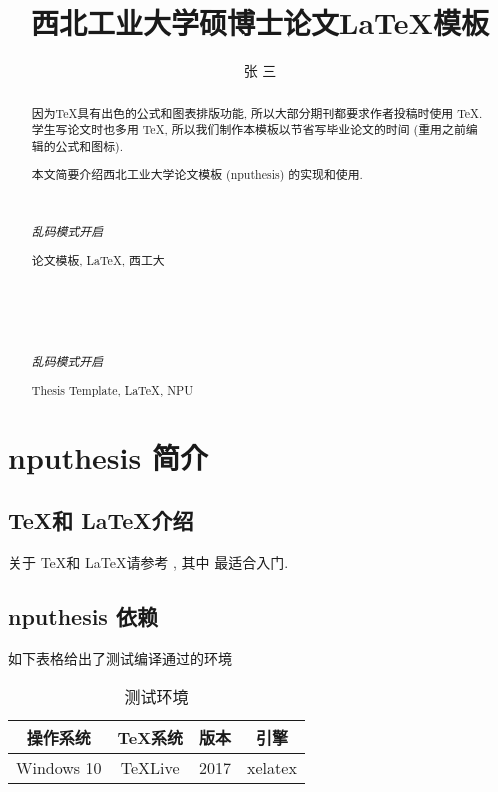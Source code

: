 \documentclass[twoside,UTF8,phd]{nputhesis}
\title[\LaTeX\ Template for Thesis of NPU]{西北工业大学硕博士论文\LaTeX 模板}
\author[San Zhang]{张\,\,三}
\theoremstyle{plain}
\begin{document}
\makecover  %
\frontmatter

\begin{abstract}  
    因为\TeX 具有出色的公式和图表排版功能, 所以大部分期刊都要求作者投稿时使用
    \TeX. 学生写论文时也多用 \TeX, 所以我们制作本模板以节省写毕业论文的时间 
    (重用之前编辑的公式和图标).

    本文简要介绍西北工业大学论文模板 (nputhesis) 的实现和使用.

    { %
        \noindent\hrulefill\\
        {\centerline {\it 乱码模式开启}}
        \noindent\hrulefill
    }
    \begin{keywords}
        论文模板, \LaTeX, 西工大 
    \end{keywords}
\end{abstract}

\begin{Abstract}

    { %
        \noindent\hrulefill\\
        {\centerline {\it 乱码模式开启}}
        \noindent\hrulefill
    }
    \begin{Keywords}
        Thesis Template, \LaTeX, NPU
    \end{Keywords}
\end{Abstract}

\tableofcontents 

\mainmatter  %
\chapter{nputhesis 简介}
\section{\TeX 和 \LaTeX 介绍}
关于 \TeX 和 \LaTeX 请参考 \cite{Knuth1986,Lamport1994,Liu2013}, 其中 \cite{Liu2013} 最适合入门.  

\section{nputhesis 依赖}
如下表格给出了测试编译通过的环境
\begin{table}[h]
  \caption{测试环境\cite{Liu2013}}
    \centering
    \begin{tabular}{cccc}
        \toprule
        操作系统    & \TeX 系统   & 版本  & 引擎\\
        \midrule
        Windows 10  & TeXLive     & 2017  & xelatex\\
        \bottomrule
    \end{tabular}
\end{table}
\end{document}
